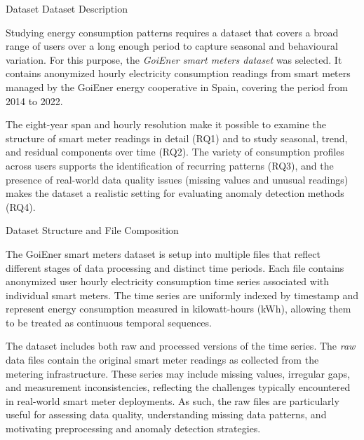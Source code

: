 ﻿\documentclass[12pt,reqno, twoside]{amsbook}
\makeatletter
\numberwithin{figure}{chapter}
\numberwithin{table}{chapter}
\numberwithin{equation}{chapter}
\def\section{\@startsection{section}{1}%
      \z@{.5\linespacing\@plus.7\linespacing}{.25\linespacing}%
      {\normalfont\bfseries\flushleft}}
\def\subsection{\@startsection{subsection}{2}%
      \z@{.5\linespacing\@plus.7\linespacing}{.25\linespacing}%
      {\normalfont\bfseries\flushleft}}
\theoremstyle{plain}
\numberwithin{equation}{chapter}
\numberwithin{section}{chapter}
\makeatother
\begin{document}
\section{Dataset}
\label{sec:dataset}
\subsection{Dataset Description}
\label{subsection:Dataset}

\noindent Studying energy consumption patterns requires a dataset that covers a broad range of users over a long enough period to capture seasonal and behavioural variation. For this purpose, the \textit{GoiEner smart meters dataset} \cite{goiener_smart_meters_2022} was selected. It contains anonymized hourly electricity consumption readings from smart meters managed by the GoiEner energy cooperative in Spain, covering the period from 2014 to 2022.

The eight-year span and hourly resolution make it possible to examine the structure of smart meter readings in detail (RQ1) and to study seasonal, trend, and residual components over time (RQ2). The variety of consumption profiles across users supports the identification of recurring patterns (RQ3), and the presence of real-world data quality issues (missing values and unusual readings) makes the dataset a realistic setting for evaluating anomaly detection methods (RQ4).

\subsection{Dataset Structure and File Composition}
\label{subsection:Dataset Structure and File Composition}

\noindent
The GoiEner smart meters dataset is setup into multiple files that reflect different stages of data processing and distinct time periods. Each file contains anonymized user hourly electricity consumption time series associated with individual smart meters. The time series are uniformly indexed by timestamp and represent energy consumption measured in kilowatt-hours (kWh), allowing them to be treated as continuous temporal sequences.

The dataset includes both raw and processed versions of the time series. The \textit{raw} data files contain the original smart meter readings as collected from the metering infrastructure. These series may include missing values, irregular gaps, and measurement inconsistencies, reflecting the challenges typically encountered in real-world smart meter deployments. As such, the raw files are particularly useful for assessing data quality, understanding missing data patterns, and motivating preprocessing and anomaly detection strategies.
\end{document}
